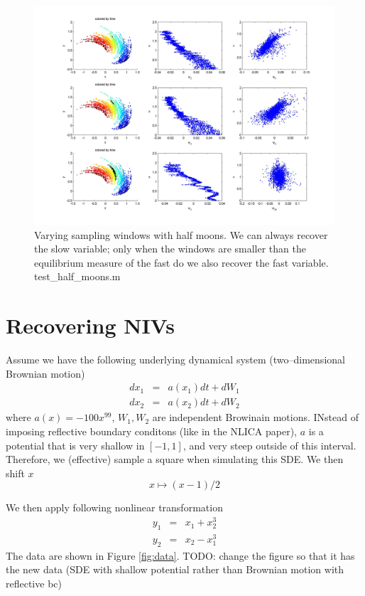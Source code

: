 \documentclass[12pt]{article}
\begin{document}
\begin{figure}
\includegraphics[width=\textwidth]{vary_windows_halfmoons}
\caption{Varying sampling windows with half moons. We can always recover the slow variable; only when the windows are smaller than the equilibrium measure of the fast do we also recover the fast variable. test\_half\_moons.m}
\label{fig:halfmoons}
\end{figure}



\section{Recovering NIVs}


Assume we have the following underlying dynamical system (two--dimensional Brownian motion)
\begin{eqnarray}
	dx_1 & = & a(x_1) dt + dW_1 \\
	dx_2 & = & a(x_2) dt + dW_2
\end{eqnarray}
where $a(x) = -100x^{99}$, $W_1, W_2$ are independent Browinain motions.
%
INstead of imposing reflective boundary conditons (like in the NLICA paper), $a$ is a potential that is very shallow in $[-1, 1]$, and very steep outside of this interval.
%
Therefore, we (effective) sample a square when simulating this SDE.
%
We then shift $x$
\begin{equation}
x \mapsto (x-1)/2
\end{equation}

We then apply following nonlinear transformation
%
\begin{eqnarray}
y_1 & = & x_1 + x_2^3 \\
y_2 & = & x_2 - x_1^3
\end{eqnarray}
%
The data are shown in Figure \ref{fig:data}.
%
TODO: change the figure so that it has the new data (SDE with shallow potential rather than Brownian motion with reflective bc)
\end{document}
